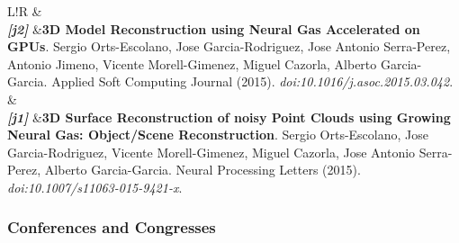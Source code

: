 \documentclass[8pt]{article}
\newcommand\VRule{\color{lightgray}\vrule width 0.5pt}
\begin{document}
\begin{tabular}{L!{\VRule}R}
	& \\ 
	\emph{\textbf{[j2]}} &\textbf{3D Model Reconstruction using Neural Gas Accelerated on GPUs}. Sergio Orts-Escolano, Jose Garcia-Rodriguez, Jose Antonio Serra-Perez, Antonio Jimeno, Vicente Morell-Gimenez, Miguel Cazorla, Alberto Garcia-Garcia. Applied Soft Computing Journal (2015). \emph{doi:10.1016/j.asoc.2015.03.042}.\\
	& \\
	\emph{\textbf{[j1]}} &\textbf{3D Surface Reconstruction of noisy Point Clouds using Growing Neural Gas: Object/Scene Reconstruction}. Sergio Orts-Escolano, Jose Garcia-Rodriguez, Vicente Morell-Gimenez, Miguel Cazorla, Jose Antonio Serra-Perez, Alberto Garcia-Garcia. Neural Processing Letters (2015). \emph{doi:10.1007/s11063-015-9421-x}. \\
\end{tabular}

\subsubsection*{Conferences and Congresses}
\end{document}
